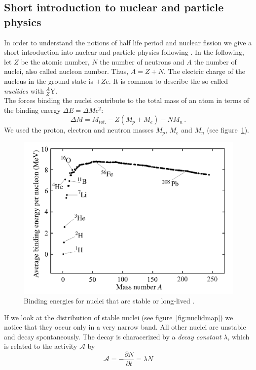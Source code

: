 \subsection{Short introduction to nuclear and particle physics}
In order to understand the notions of half life period and nuclear fission we
give a short introduction into nuclear and particle physics following \cite{Hooshyar}.
In the following, let $Z$ be the atomic number, $N$ the number of neutrons and $A$ the number of nuclei, also
called nucleon number. Thus, $A = Z + N$. The electric charge of the nucleus in the ground state is $+Z e$.
It is common to describe the so called \emph{nuclides} with $_{Z}^{A}\textrm{Y}$.\\
The forces binding the nuclei contribute to the total mass of an atom in terms of the 
binding energy $\Delta E = \Delta M c^2$:
\begin{equation}
\Delta M = M_{tot.} - Z(M_p + M_e) - N M_n \, .
\end{equation}
We used the proton, electron and neutron masses $M_p$, $M_e$ and $M_n$ 
(see figure~\ref{fig:bindingenergy}).
\begin{figure}[htpb]
    \centering
    \includegraphics[width=0.8\linewidth]{figures/bindingenergy}
    \caption{Binding energies for nuclei that are stable or long-lived \cite{Hooshyar}.}
    \label{fig:bindingenergy}
\end{figure}
If we look at the distribution of stable nuclei (see figure~\ref{fig:nuclidmap}) we notice
that they occur only in a very narrow band. All other nuclei are unstable and decay spontaneously.
The decay is characerized by a \textit{decay constant} $\lambda$, which is related to the activity $\mathcal{A}$
by 
\begin{equation}\label{eq:decay}
    \mathcal{A} = -\frac{\partial N}{\partial t} = \lambda N 
\end{equation}
